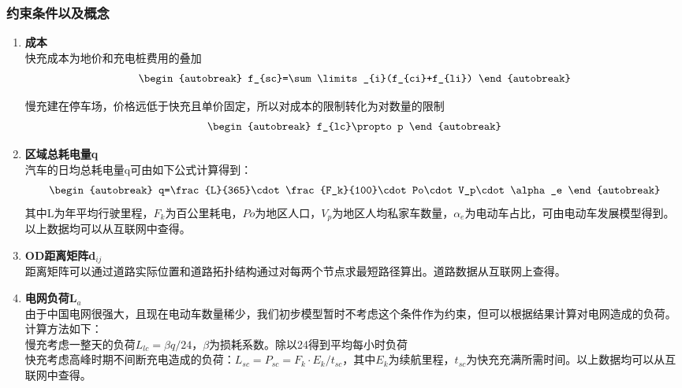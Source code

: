 \documentclass[12pt, a4paper, oneside]{ctexart}
\begin{document}
    \subsubsection{约束条件以及概念}
    \begin{enumerate}[label = \alph*)]
        \item \textbf{成本}\\
            快充成本为地价和充电桩费用的叠加
            \begin{align}\begin{autobreak}
	            f_{sc}=\sum\limits_{i}(f_{ci}+f_{li})
            \end{autobreak}\end{align}

        

            慢充建在停车场，价格远低于快充且单价固定，所以对成本的限制转化为对数量的限制\begin{align}\begin{autobreak}
	f_{lc}\propto p
\end{autobreak}\end{align}
        \item \textbf{区域总耗电量q}\\
            汽车的日均总耗电量q可由如下公式计算得到：
            \begin{align}\begin{autobreak}
	q=\frac{L}{365}\cdot \frac{F_k}{100}\cdot Po\cdot V_p\cdot \alpha_e
\end{autobreak}\end{align}
            其中L为年平均行驶里程，\(F_k\)为百公里耗电，\(Po\)为地区人口，\(V_p\)为地区人均私家车数量，\(\alpha_e\)为电动车占比，可由电动车发展模型得到。以上数据均可以从互联网中查得。
        \item \textbf{OD距离矩阵d\(_{ij}\)}\\
            距离矩阵可以通过道路实际位置和道路拓扑结构通过对每两个节点求最短路径算出。道路数据从互联网上查得。
        \item \textbf{电网负荷L\(_a\)}\\
            由于中国电网很强大，且现在电动车数量稀少，我们初步模型暂时不考虑这个条件作为约束，但可以根据结果计算对电网造成的负荷。计算方法如下：\\
            慢充考虑一整天的负荷\(L_{lc}=\beta q/24\)，\(\beta\)为损耗系数。除以24得到平均每小时负荷\\
            快充考虑高峰时期不间断充电造成的负荷：\(L_{sc}=P_{sc}=F_k\cdot E_k/t_{sc}\)，其中\(E_k\)为续航里程，\(t_{sc}\)为快充充满所需时间。以上数据均可以从互联网中查得。


\end{enumerate}
\end{document}
